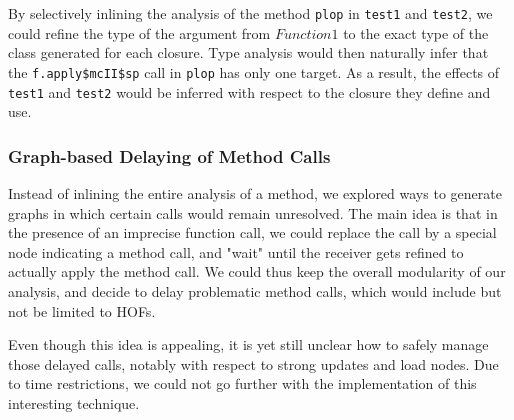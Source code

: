 By selectively inlining the analysis of the method \verb/plop/ in \verb/test1/ and
\verb/test2/, we could refine the type of the argument from $Function1$ to the
exact type of the class generated for each closure. Type analysis would then
naturally infer that the \verb/f.apply$mcII$sp/ call in \verb/plop/ has only
one target.  As a result, the effects of \verb/test1/ and \verb/test2/ would be
inferred with respect to the closure they define and use.

\subsubsection{Graph-based Delaying of Method Calls}
Instead of inlining the entire analysis of a method, we explored ways to
generate graphs in which certain calls would remain unresolved. The main idea
is that in the presence of an imprecise function call, we could replace the
call by a special node indicating a method call, and "wait" until the receiver
gets refined to actually apply the method call. We could thus keep the overall
modularity of our analysis, and decide to delay problematic method calls, which
would include but not be limited to HOFs.

Even though this idea is appealing, it is yet still unclear how to safely
manage those delayed calls, notably with respect to strong updates and load
nodes. Due to time restrictions, we could not go further with the implementation
of this interesting technique.

